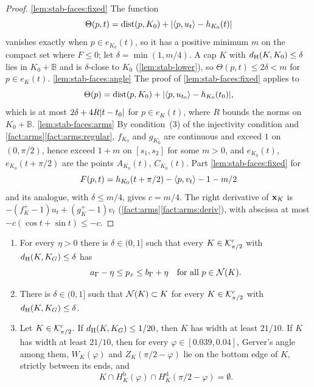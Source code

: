 \begin{proof}
\ref{lem:stab-faces:fixed} The function
\[
  \Theta(p,t)=\operatorname{dist}(p,K_0)+\lvert \langle p,u_t\rangle-h_{K_0}(t)\rvert
\]
vanishes exactly when $p\in e_{K_0}(t)$, so it has a positive minimum $m$ on
the compact set where $F\le0$; let $\delta=\min(1,m/4)$. A cap $K$ with
$d_{\mathrm{H}}(K,K_0)\le\delta$ lies in $K_0+\mathbb B$ and is $\delta$-close to $K_0$
(\cref{lem:stab-lower}), so $\Theta(p,t)\le2\delta<m$ for $p\in e_K(t)$.
\ref{lem:stab-faces:angle} The proof of \ref{lem:stab-faces:fixed} applies to
\[
  \Theta(p)=\operatorname{dist}(p,K_0)+\lvert \langle p,u_{t_0}\rangle-h_{K_0}(t_0)\rvert,
\]
which is at most $2\delta+4R\lvert t-t_0\rvert$ for $p\in e_K(t)$, where $R$ bounds
the norms on $K_0+\mathbb B$. \ref{lem:stab-faces:arms} By condition~(3) of the
injectivity condition and \cref{fact:arms}\ref{fact:arms:regular}, $f_{K_0}$
and $g_{K_0}$ are continuous and exceed $1$ on $(0,\pi/2)$, hence exceed $1+m$
on $[s_1,s_2]$ for some $m>0$, and $e_{K_0}(t)$, $e_{K_0}(t+\pi/2)$ are the
points $A_{K_0}(t)$, $C_{K_0}(t)$. Part \ref{lem:stab-faces:fixed} for
\[
  F(p,t)=h_{K_0}(t+\pi/2)-\langle p,v_t\rangle-1-m/2
\]
and its analogue, with $\delta\le m/4$, gives $c=m/4$. The right derivative of
$\mathbf{x}_K$ is $-(f^+_K-1)u_t+(g^+_K-1)v_t$ (\cref{fact:arms}\ref{fact:arms:deriv}),
with abscissa at most $-c(\cos t+\sin t)\le-c$.
\end{proof}

\begin{lemma}\label{lem:stab-niche}
\begin{enumerate}[label=(\alph*)]
\item\label{lem:stab-niche:x} For every $\eta>0$ there is $\delta\in(0,1]$
such that every $K\in\mathcal{K}^{\mathrm{c}}_{\pi/2}$ with $d_{\mathrm{H}}(K,K_G)\le\delta$ has
\[
  a_\Gamma-\eta\le p_x\le b_\Gamma+\eta\quad\text{for all }p\in\mathcal{N}(K).
\]
\item\label{lem:stab-niche:sub} There is $\delta\in(0,1]$ such that
$\mathcal{N}(K)\subset K$ for every $K\in\mathcal{K}^{\mathrm{c}}_{\pi/2}$ with $d_{\mathrm{H}}(K,K_G)\le\delta$.
\item\label{lem:stab-niche:width} Let $K\in\mathcal{K}^{\mathrm{c}}_{\pi/2}$. If
$d_{\mathrm{H}}(K,K_G)\le1/20$, then $K$ has width at least $21/10$. If $K$ has width at
least $21/10$, then for every $\varphi\in[0.039,0.04]$, Gerver's angle among
them, $W_K(\varphi)$ and $Z_K(\pi/2-\varphi)$ lie on the bottom edge of $K$,
strictly between its ends, and
\[
  K\cap H^{\mathrm b}_K(\varphi)\cap H^{\mathrm d}_K(\pi/2-\varphi)=\emptyset.
\]
\end{enumerate}
\end{lemma}

